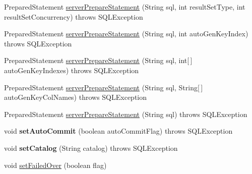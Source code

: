 \begin{DoxyCompactItemize}
\item 
Prepared\+Statement \mbox{\hyperlink{classcom_1_1mysql_1_1cj_1_1jdbc_1_1ha_1_1_multi_host_my_s_q_l_connection_ae6fa263dc52294e1239edd02a280ab6d}{server\+Prepare\+Statement}} (String sql, int result\+Set\+Type, int result\+Set\+Concurrency)  throws S\+Q\+L\+Exception 
\item 
Prepared\+Statement \mbox{\hyperlink{classcom_1_1mysql_1_1cj_1_1jdbc_1_1ha_1_1_multi_host_my_s_q_l_connection_a26a0ffb4b44f358479e5a39a3241837f}{server\+Prepare\+Statement}} (String sql, int auto\+Gen\+Key\+Index)  throws S\+Q\+L\+Exception 
\item 
Prepared\+Statement \mbox{\hyperlink{classcom_1_1mysql_1_1cj_1_1jdbc_1_1ha_1_1_multi_host_my_s_q_l_connection_a5c69e6b4ee9462919ab63d9e3c563294}{server\+Prepare\+Statement}} (String sql, int\mbox{[}$\,$\mbox{]} auto\+Gen\+Key\+Indexes)  throws S\+Q\+L\+Exception 
\item 
Prepared\+Statement \mbox{\hyperlink{classcom_1_1mysql_1_1cj_1_1jdbc_1_1ha_1_1_multi_host_my_s_q_l_connection_ae0fc18db059bf9625bc8741334de6eef}{server\+Prepare\+Statement}} (String sql, String\mbox{[}$\,$\mbox{]} auto\+Gen\+Key\+Col\+Names)  throws S\+Q\+L\+Exception 
\item 
Prepared\+Statement \mbox{\hyperlink{classcom_1_1mysql_1_1cj_1_1jdbc_1_1ha_1_1_multi_host_my_s_q_l_connection_a7db176300b273436df94f2cc48e986af}{server\+Prepare\+Statement}} (String sql)  throws S\+Q\+L\+Exception 
\item 
\mbox{\label{classcom_1_1mysql_1_1cj_1_1jdbc_1_1ha_1_1_multi_host_my_s_q_l_connection_a0bae3a8893472a934d5f0a8247083f79}} 
void {\bfseries set\+Auto\+Commit} (boolean auto\+Commit\+Flag)  throws S\+Q\+L\+Exception 
\item 
\mbox{\label{classcom_1_1mysql_1_1cj_1_1jdbc_1_1ha_1_1_multi_host_my_s_q_l_connection_ac5b5de38f432b66b204ab94f3bcabb3a}} 
void {\bfseries set\+Catalog} (String catalog)  throws S\+Q\+L\+Exception 
\item 
void \mbox{\hyperlink{classcom_1_1mysql_1_1cj_1_1jdbc_1_1ha_1_1_multi_host_my_s_q_l_connection_aa86a711c0807cc5b31b9e3600477184b}{set\+Failed\+Over}} (boolean flag)
\item 
\mbox{\label{classcom_1_1mysql_1_1cj_1_1jdbc_1_1ha_1_1_multi_host_my_s_q_l_connection_ad435a72c578f5dc749fc299c2e3677f0}} 

\end{DoxyCompactItemize}

